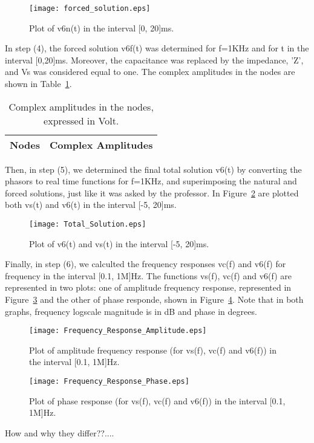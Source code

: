 \begin{figure}[h] \centering
\texttt{[image: forced\_solution.eps]}
\caption{Plot of v6n(t) in the interval [0, 20]ms.}
\label{fig:plotA(4)}
\end{figure}

In step (4), the forced solution v6f(t) was determined for f=1KHz and for t in the interval [0,20]ms. Moreover, the capacitance was replaced by the impedance, 'Z', and Vs was considered equal to one. The complex amplitudes in the nodes are shown in Table~\ref{tab:TA4}.

\begin{table}[h]
  \centering
  \begin{tabular}{|l|r|}
    \hline    
    {\bf Nodes} & {\bf Complex Amplitudes} \\ \hline
    
  \end{tabular}
  \caption{Complex amplitudes in the nodes, expressed in Volt.}
  \label{tab:TA4}
\end{table}

Then, in step (5), we determined the final total solution v6(t) by converting the phasors to real time functions for f=1KHz, and superimposing the natural and forced solutions, just like it was asked by the professor. In Figure~\ref{fig:plotA(5)} are plotted both vs(t) and v6(t) in the interval [-5, 20]ms.

\begin{figure}[h] \centering
\texttt{[image: Total\_Solution.eps]}
\caption{Plot of v6(t) and vs(t) in the interval [-5, 20]ms.}
\label{fig:plotA(5)}
\end{figure}

Finally, in step (6), we calculted the frequency responses vc(f) and v6(f) for frequency in the interval [0.1, 1M]Hz. The functions vs(f), vc(f) and v6(f) are represented in two plots: one of amplitude frequency response, represented in Figure~\ref{fig:plotA(61)} and the other of phase responde, shown in Figure~\ref{fig:plotA(62)}. Note that in both graphs, frequency logscale magnitude is in dB and phase in degrees.

\begin{figure}[h] \centering
\texttt{[image: Frequency\_Response\_Amplitude.eps]}
\caption{Plot of amplitude frequency response (for vs(f), vc(f) and v6(f)) in the interval [0.1, 1M]Hz.}
\label{fig:plotA(61)}
\end{figure}

\begin{figure}[h] \centering
\texttt{[image: Frequency\_Response\_Phase.eps]}
\caption{Plot of phase response (for vs(f), vc(f) and v6(f)) in the interval [0.1, 1M]Hz.}
\label{fig:plotA(62)}
\end{figure}

How and why they differ??....
